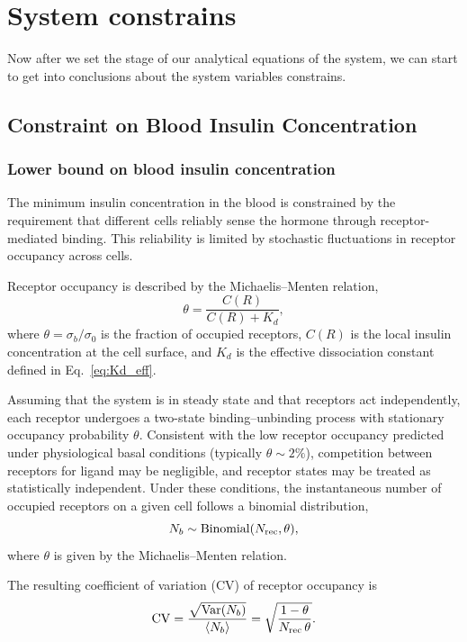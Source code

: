 \section{System constrains}\label{sec:constraints}
Now after we set the stage of our analytical equations of the system, we can start to get into conclusions about the system variables constrains.

\subsection{Constraint on Blood Insulin Concentration}\label{sec:blood_constraint}

\subsubsection{Lower bound on blood insulin concentration}\label{sec:lower_bound}
The minimum insulin concentration in the blood is constrained by the requirement that different cells reliably sense the hormone through receptor-mediated binding.
This reliability is limited by stochastic fluctuations in receptor occupancy across cells.

Receptor occupancy is described by the Michaelis--Menten relation,
\begin{equation}
    \theta = \frac{C(R)}{C(R) + K_d},
    \label{eq:theta_mm}
\end{equation}
where $\theta = \sigma_b / \sigma_0$ is the fraction of occupied receptors, $C(R)$ is the local insulin concentration at the cell surface, and $K_d$ is the effective dissociation constant defined in Eq.~\eqref{eq:Kd_eff}.

Assuming that the system is in steady state and that receptors act independently, each receptor undergoes a two-state binding--unbinding process with stationary occupancy probability $\theta$.
Consistent with the low receptor occupancy predicted under physiological basal conditions (typically $\theta \sim 2\%$), competition between receptors for ligand may be negligible, and receptor states may be treated as statistically independent.
Under these conditions, the instantaneous number of occupied receptors on a given cell follows a binomial distribution,
\begin{equation}
    N_b \sim \mathrm{Binomial}(N_{\mathrm{rec}}, \theta),
    \label{eq:binomial}
\end{equation}
where $\theta$ is given by the Michaelis--Menten relation.

The resulting coefficient of variation (CV) of receptor occupancy is
\begin{equation}
    \mathrm{CV} = \frac{\sqrt{\mathrm{Var}(N_b)}}{\langle N_b \rangle} = \sqrt{\frac{1 - \theta}{N_{\mathrm{rec}} \,\theta}}.
    \label{eq:CV}
\end{equation}

